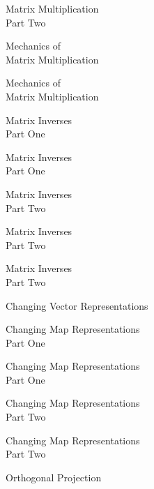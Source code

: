 \documentclass{titlescreen}
\begin{document}
\begin{videotitle}
  Matrix Multiplication  \\[1ex]
  Part Two
\end{videotitle}
\begin{videoend}
  Mechanics of \\[0.5ex]
  Matrix Multiplication
\end{videoend}

\begin{videotitle}
  Mechanics of \\[0.5ex]
  Matrix Multiplication 
\end{videotitle}
\begin{videoend}
  Matrix Inverses  \\[1ex]
  Part One
\end{videoend}

\begin{videotitle}
  Matrix Inverses  \\[1ex]
  Part One
\end{videotitle}
\begin{videoend}
  Matrix Inverses  \\[1ex]
  Part Two
\end{videoend}

\begin{videotitle}
  Matrix Inverses  \\[1ex]
  Part Two
\end{videotitle}
\begin{videoend}
  Matrix Inverses  \\[1ex]
  Part Two
\end{videoend}


\begin{videotitle}
  Changing Vector Representations
\end{videotitle}
\begin{videoend}
  Changing Map Representations \\[1ex]
  Part One
\end{videoend}

\begin{videotitle}
  Changing Map Representations \\[1ex]
  Part One
\end{videotitle}
\begin{videoend}
  Changing Map Representations \\[1ex]
  Part Two
\end{videoend}

\begin{videotitle}
  Changing Map Representations \\[1ex]
  Part Two
\end{videotitle}
\begin{videoend}
  Orthogonal Projection  
\end{videoend}
\end{document}
